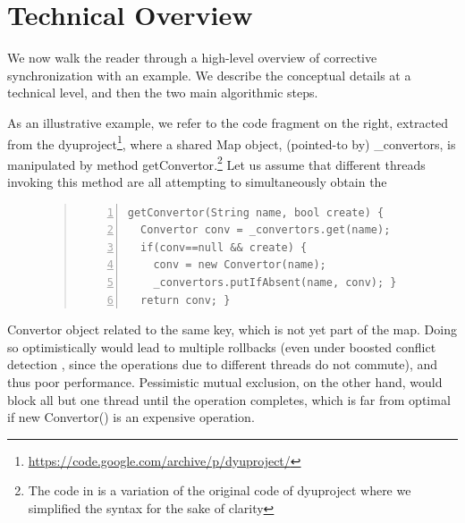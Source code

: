\section{Technical Overview}

We now walk the reader through a high-level overview of corrective synchronization with an example. We  describe the conceptual details at a technical level, and then the two main algorithmic steps.

%
As an illustrative example, we refer to the code fragment
on the
right,
extracted from the {\sf dyuproject}\footnote{\url{https://code.google.com/archive/p/dyuproject/}}, where a shared {\sf Map} object, (pointed-to by) {\sf \_convertors}, is manipulated by method {\sf getConvertor}.\footnote{The code in is a variation of the original code of {\sf dyuproject} where we simplified the syntax for the sake of clarity}
%
%
Let us assume that different threads invoking this method
are all attempting to simultaneously obtain the
\begin{figure}
  \begin{quote}
	\begin{lstlisting}[numbers=left]
getConvertor(String name, bool create) {
  Convertor conv = _convertors.get(name);
  if(conv==null && create) {
    conv = new Convertor(name);
    _convertors.putIfAbsent(name, conv); }
  return conv; }
	\end{lstlisting}
        \end{quote}
\end{figure}
%
{\sf Convertor} object related to the same key, which is not yet part of the map. Doing so optimistically would lead to multiple rollbacks (even under boosted conflict detection \cite{ppopp08}, since the operations due to different threads do not commute), and thus poor performance. Pessimistic mutual exclusion, on the other hand, would block all but one thread until the operation completes, which is far from optimal if {\sf new Convertor()} is an expensive operation.



